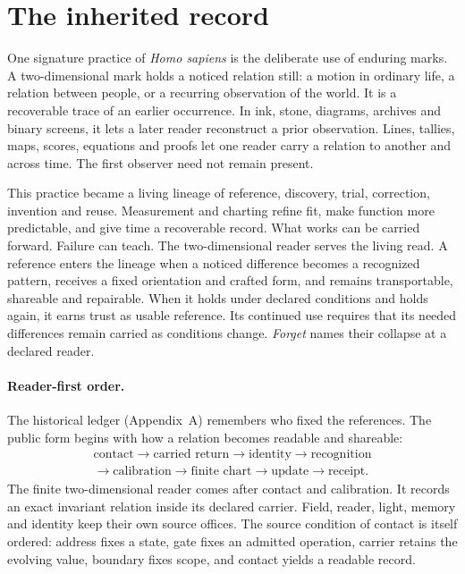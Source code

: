 \documentclass[11pt,a4paper]{article}
\theoremstyle{plain}
\theoremstyle{definition}
\theoremstyle{remark}
\begin{document}
\section{The inherited record}\label{sec:inherited}
One signature practice of \emph{Homo sapiens} is the deliberate use of enduring marks. A two-dimensional mark holds a noticed relation still: a motion in ordinary life, a relation between people, or a recurring observation of the world. It is a recoverable trace of an earlier occurrence. In ink, stone, diagrams, archives and binary screens, it lets a later reader reconstruct a prior observation. Lines, tallies, maps, scores, equations and proofs let one reader carry a relation to another and across time. The first observer need not remain present.

This practice became a living lineage of reference, discovery, trial, correction, invention and reuse. Measurement and charting refine fit, make function more predictable, and give time a recoverable record. What works can be carried forward. Failure can teach. The two-dimensional reader serves the living read. A reference enters the lineage when a noticed difference becomes a recognized pattern, receives a fixed orientation and crafted form, and remains transportable, shareable and repairable. When it holds under declared conditions and holds again, it earns trust as usable reference. Its continued use requires that its needed differences remain carried as conditions change. \emph{Forget} names their collapse at a declared reader.

\paragraph{Reader-first order.} The historical ledger (Appendix~A) remembers who fixed the references. The public form begins with how a relation becomes readable and shareable:
\[
\begin{gathered}\text{contact}\to\text{carried return}\to\text{identity}\to\text{recognition}\\
\to\text{calibration}\to\text{finite chart}\to\text{update}\to\text{receipt.}\end{gathered}
\]
The finite two-dimensional reader comes after contact and calibration. It records an exact invariant relation inside its declared carrier. Field, reader, light, memory and identity keep their own source offices. The source condition of contact is itself ordered: address fixes a state, gate fixes an admitted operation, carrier retains the evolving value, boundary fixes scope, and contact yields a readable record.
\end{document}
